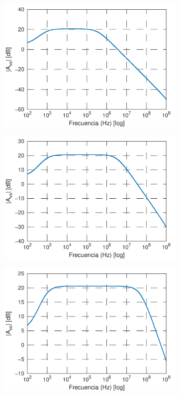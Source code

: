\documentclass[a4paper, 10pt, spanish]{article}
\begin{document}
\begin{center}
  \includegraphics[width=0.7\textwidth]{sim_x1_bode.png}
  \label{fig:sim-x1}
\end{center}

\begin{center}
  \includegraphics[width=0.7\textwidth]{sim_x10_bode.png}
  \label{fig:sim-x10}
\end{center}

\begin{center}
  \includegraphics[width=0.7\textwidth]{sim_activa_bode.png}
  \label{fig:sim-activa}
\end{center}
\end{document}
